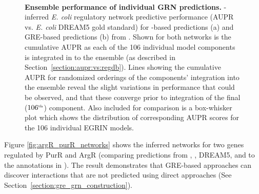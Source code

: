 \begin{figure}[hp]
\centering
\mbox{
}
\caption[Ensemble performance of individual GRN predictions]{\textbf{Ensemble performance of individual GRN predictions.} \egrine-inferred \textit{E. coli} regulatory network predictive performance (AUPR vs. {\it E. coli} DREAM5 \cite{marbach_wisdom_2012} gold standard) for \nwinf-based predictions (a) and GRE-based predictions (b) from \egrine. Shown for both networks is the cumulative AUPR as each of the 106 individual model components is integrated in to the ensemble (as described in Section~\ref{section:aupr:vs:regdb}). Lines showing the cumulative AUPR for randomized orderings of the components' integration into the ensemble reveal the slight variations in performance that could be observed, and that these converge prior to integration of the final ($106^{\text{\tiny th}}$) component. Also included for comparison is a box-whisker plot which shows the distribution of corresponding AUPR scores for the 106 individual EGRIN models. } 
\label{fig:cumulative_auprs}
\end{figure} 

Figure \ref{fig:argR_purR_networks} shows the inferred networks for two genes regulated by PurR and ArgR (comparing predictions from \egrine, , DREAM5, and  to the annotations in \rdb). The result demonstrates that GRE-based approaches can discover interactions that are not predicted using direct approaches (See Section~\ref{section:gre_grn_construction}).

